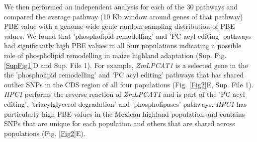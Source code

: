 \documentclass[9pt,twocolumn,twoside,lineno]{BioRxiv}
\begin{document}
We then performed an independent analysis for each of the 30 pathways and compared the average pathway (10 Kb window around genes of that pathway) PBE value with a genome-wide genic random sampling distribution of PBE values. 
We found that 'phospholipid remodelling'  and 'PC acyl editing'  pathways had significantly high PBE values in all four populations indicating a possible role of phospholipid remodelling in maize highland adaptation (Sup. Fig. \ref{SupFig1}D and Sup. File 1). 
For example, \textit{ZmLPCAT1} is a selected gene  in the the 'phospholipid remodelling' and 'PC acyl editing' pathways that has shared outlier SNPs in the CDS region of all four populations (Fig. \ref{Fig2}E, Sup. File 1). 
\textit{HPC1} performs the reverse reaction of \textit{ZmLPCAT1} and is part of the 'PC acyl editing', 'triacylglycerol degradation' and 'phospholipases' pathways. 
\textit{HPC1} has particularly high PBE values in the Mexican highland population and contains SNPs that are unique for each population and others that are shared across populations (Fig. \ref{Fig2}E). 
\end{document}
